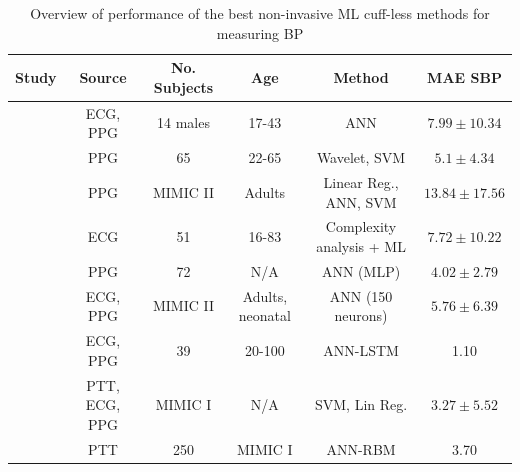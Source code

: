 \begin{landscape}
    \begin{table}[H]
        \caption{Overview of performance of  the best non-invasive ML cuff-less methods for measuring BP}
        \begin{tabular}{|c|c|c|c|c|c|}
        \hline
        \textbf{Study} & \textbf{Source} & \textbf{No. Subjects} & \textbf{Age} & \textbf{Method} & \textbf{MAE SBP} \\ \hline
        \cite{Yang2020} & ECG, PPG & 14 males & 17-43 & ANN & $7.99 \pm 10.34$\\
        \cite{Gao2016} & PPG & 65 & 22-65 & Wavelet, SVM & $5.1 \pm 4.34$\\
        \cite{Kachuee2015} & PPG & MIMIC II & Adults & Linear Reg., ANN, SVM &  $13.84\pm  17.56$\\
        \cite{Simjanoska20182} & ECG & 51 & 16-83 & Complexity analysis + ML &  $7.72 \pm  10.22$\\ 
        \cite{Wang2018} & PPG & 72 & N/A & ANN (MLP) & $4.02 \pm 2.79$\\
        \cite{Pradenas2020} & ECG, PPG & MIMIC II & Adults,  neonatal & ANN (150 neurons) & $5.76 \pm 6.39$\\
        \cite{Tanveer2018} & ECG, PPG & 39 & 20-100 & ANN-LSTM & 1.10\\
        \cite{Chen2019} & PTT, ECG, PPG & MIMIC I & N/A & SVM, Lin Reg. & $3.27 \pm 5.52$\\ 
        \cite{Ripoll2019} & PTT & 250 & MIMIC I & ANN-RBM & 3.70\\\hline
        \end{tabular}
        \label{litsurveytab2}
    \end{table}
\end{landscape}
